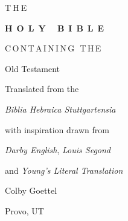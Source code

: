 \begin{titlepage}
    \begin{center}
        {T$\:$H$\:$E}
        
        \vspace{10pt}
        
        {\Huge \textbf{\textsc{H$\;\:$O$\;\:$L$\;\:$Y$\;\:$ $\;\:$B$\;\:$I$\;\:$B$\;\:$L$\;\:$E}}}
        
        \vspace{35pt}
        
        {C$\,$O$\,$N$\,$T$\,$A$\,$I$\,$N$\,$I$\,$N$\,$G$\,$ $\,$T$\,$H$\,$E}
        
        \vspace{10pt}
        
        {\huge Old Testament}
        
        \vspace{100pt}
        
        {Translated from the}
        
        \vspace{5pt}
        
        {\large \emph{Biblia Hebraica Stuttgartensia}}
        
        \vspace{5pt}
        
        {with inspiration drawn from}
        
        \vspace{5pt}
        
        {\emph{Darby English}, \emph{Louis Segond}}
        
        \vspace{5pt}
        
        {and \emph{Young's Literal Translation}}
        
        \vfill
        
        {\large Colby Goettel}
        
        \vspace{2.5pt}
        
        {\small Provo, UT}
    \end{center}
\end{titlepage}
